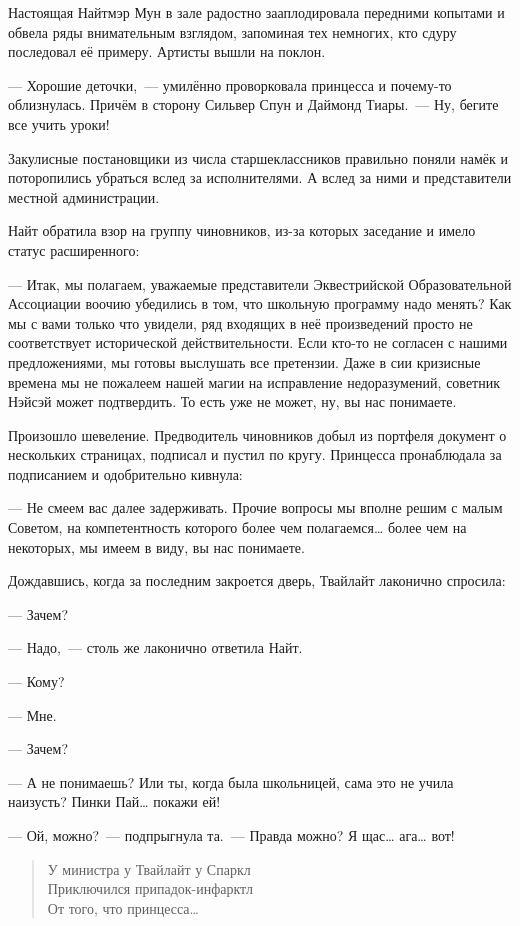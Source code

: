 \documentclass[twoside,a5paper,12pt]{extbook}
\begin{document}
Настоящая Найтмэр Мун в зале радостно зааплодировала передними копытами и обвела ряды внимательным взглядом, запоминая тех немногих, кто сдуру последовал её примеру. Артисты вышли на поклон.

— Хорошие деточки, — умилённо проворковала принцесса и почему-то облизнулась. Причём в сторону Сильвер Спун и Даймонд Тиары. — Ну, бегите все учить уроки!

Закулисные постановщики из числа старшеклассников правильно поняли намёк и поторопились убраться вслед за исполнителями. А вслед за ними и представители местной администрации. 

Найт обратила взор на группу чиновников, из-за которых заседание и имело статус расширенного:

— Итак, мы полагаем, уважаемые представители Эквестрийской Образовательной Ассоциации воочию убедились в том, что школьную программу надо менять? Как мы с вами только что увидели, ряд входящих в неё произведений просто не соответствует исторической действительности. Если кто-то не согласен с нашими предложениями, мы готовы выслушать все претензии. Даже в сии кризисные времена мы не пожалеем нашей магии на исправление недоразумений, советник Нэйсэй может подтвердить. То есть уже не может, ну, вы нас понимаете.

Произошло шевеление. Предводитель чиновников добыл из портфеля документ о нескольких страницах, подписал и пустил по кругу. Принцесса пронаблюдала за подписанием и одобрительно кивнула:

— Не смеем вас далее задерживать. Прочие вопросы мы вполне решим с малым Советом, на компетентность которого более чем полагаемся… более чем на некоторых, мы имеем в виду, вы нас понимаете.

Дождавшись, когда за последним закроется дверь, Твайлайт лаконично спросила:

— Зачем?

— Надо, — столь же лаконично ответила Найт.

— Кому?

— Мне.

— Зачем?

— А не понимаешь? Или ты, когда была школьницей, сама это не учила наизусть? Пинки Пай… покажи ей!

— Ой, можно? — подпрыгнула та. — Правда можно? Я щас… ага… вот!


\begin{quote}
У министра у Твайлайт у Спаркл
\\
Приключился припадок-инфарктл
\\
От того, что принцесса…
\end{quote}
    
\end{document}
